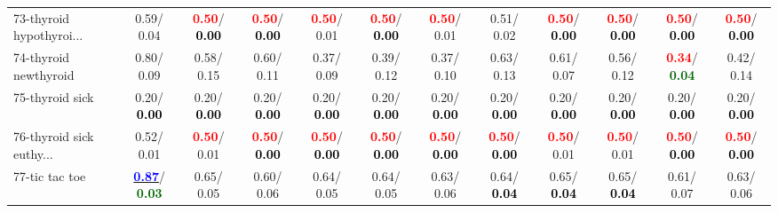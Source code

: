 \begin{table}[h]
\begin{center}
{\begin{tabular}{lc|c|c|c|c|c|c|c|c|c|c}
73-thyroid hypothyroi... &   0.59/  0.04 & \textcolor{red}{\textbf{  0.50}}/\textcolor{black}{\textbf{  0.00}} & \textcolor{red}{\textbf{  0.50}}/\textcolor{black}{\textbf{  0.00}} & \textcolor{red}{\textbf{  0.50}}/  0.01 & \textcolor{red}{\textbf{  0.50}}/\textcolor{black}{\textbf{  0.00}} & \textcolor{red}{\textbf{  0.50}}/  0.01 &   0.51/  0.02 & \textcolor{red}{\textbf{  0.50}}/\textcolor{black}{\textbf{  0.00}} & \textcolor{red}{\textbf{  0.50}}/\textcolor{black}{\textbf{  0.00}} & \textcolor{red}{\textbf{  0.50}}/\textcolor{black}{\textbf{  0.00}} & \textcolor{red}{\textbf{  0.50}}/\textcolor{black}{\textbf{  0.00}} \\
74-thyroid newthyroid &   0.80/  0.09 &   0.58/  0.15 &   0.60/  0.11 &   0.37/  0.09 &   0.39/  0.12 &   0.37/  0.10 &   0.63/  0.13 &   0.61/  0.07 &   0.56/  0.12 & \textcolor{red}{\textbf{  0.34}}/\textcolor{darkgreen}{\textbf{  0.04}} &   0.42/  0.14 \\
75-thyroid sick &   0.20/\textcolor{black}{\textbf{  0.00}} &   0.20/\textcolor{black}{\textbf{  0.00}} &   0.20/\textcolor{black}{\textbf{  0.00}} &   0.20/\textcolor{black}{\textbf{  0.00}} &   0.20/\textcolor{black}{\textbf{  0.00}} &   0.20/\textcolor{black}{\textbf{  0.00}} &   0.20/\textcolor{black}{\textbf{  0.00}} &   0.20/\textcolor{black}{\textbf{  0.00}} &   0.20/\textcolor{black}{\textbf{  0.00}} &   0.20/\textcolor{black}{\textbf{  0.00}} &   0.20/\textcolor{black}{\textbf{  0.00}} \\
76-thyroid sick euthy... &   0.52/  0.01 & \textcolor{red}{\textbf{  0.50}}/  0.01 & \textcolor{red}{\textbf{  0.50}}/\textcolor{black}{\textbf{  0.00}} & \textcolor{red}{\textbf{  0.50}}/\textcolor{black}{\textbf{  0.00}} & \textcolor{red}{\textbf{  0.50}}/\textcolor{black}{\textbf{  0.00}} & \textcolor{red}{\textbf{  0.50}}/\textcolor{black}{\textbf{  0.00}} & \textcolor{red}{\textbf{  0.50}}/\textcolor{black}{\textbf{  0.00}} & \textcolor{red}{\textbf{  0.50}}/  0.01 & \textcolor{red}{\textbf{  0.50}}/  0.01 & \textcolor{red}{\textbf{  0.50}}/\textcolor{black}{\textbf{  0.00}} & \textcolor{red}{\textbf{  0.50}}/\textcolor{black}{\textbf{  0.00}} \\
77-tic tac toe & \underline{\textcolor{blue}{\textbf{  0.87}}}/\textcolor{darkgreen}{\textbf{  0.03}} &   0.65/  0.05 &   0.60/  0.06 &   0.64/  0.05 &   0.64/  0.05 &   0.63/  0.06 &   0.64/\textcolor{black}{\textbf{  0.04}} &   0.65/\textcolor{black}{\textbf{  0.04}} &   0.65/\textcolor{black}{\textbf{  0.04}} &   0.61/  0.07 &   0.63/  0.06 \\

\end{tabular}}
\end{center}
\end{table}
